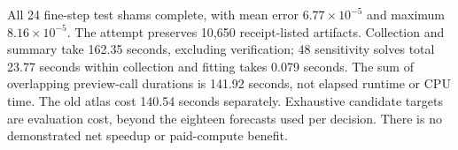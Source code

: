 All 24 fine-step test shams complete, with mean error $6.77\times10^{-5}$ and maximum $8.16\times10^{-5}$. The attempt preserves 10,650 receipt-listed artifacts. Collection and summary take 162.35 seconds, excluding verification; 48 sensitivity solves total 23.77 seconds within collection and fitting takes 0.079 seconds. The sum of overlapping preview-call durations is 141.92 seconds, not elapsed runtime or CPU time. The old atlas cost 140.54 seconds separately. Exhaustive candidate targets are evaluation cost, beyond the eighteen forecasts used per decision. There is no demonstrated net speedup or paid-compute benefit.
